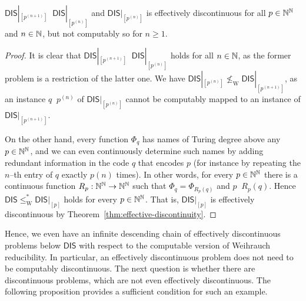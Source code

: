 \documentclass{amsart}
\def\IN{{\Bbb{N}}}
\def\leqT{\mathop{\leq_{\mathrm{T}}}}
\def\equivT{\mathop{\equiv_{\mathrm{T}}}}
\def\leqSW{\mathop{\leq_{\mathrm{sW}}}}
\def\lW{\mathop{<_{\mathrm{W}}}}
\def\leqT{\mathop{\leq_{\mathrm{T}}}}
\def\equivT{\mathop{\equiv_{\mathrm{T}}}}
\def\leqSW{\mathop{\leq_{\mathrm{sW}}}}
\def\lW{\mathop{<_{\mathrm{W}}}}
\def\DIS{\mathsf{DIS}}
\begin{document}
\begin{proposition}
\label{prop:decreasing-DIS-chain}
$\DIS|_{[p^{(n+1)}]}\lW\DIS|_{[p^{(n)}]}$ and $\DIS|_{[p^{(n)}]}$ is effectively discontinuous for all $p\in\IN^\IN$ and $n\in\IN$, but not computably so for $n\geq1$.
\end{proposition}
\begin{proof}
It is clear that $\DIS|_{[p^{(n+1)}]}\leqSW\DIS|_{[p^{(n)}]}$ holds for all $n\in\IN$, as the 
former problem is a restriction of the latter one. We have $\DIS|_{[p^{(n)}]}\not\leq_\mathrm{W}\DIS|_{[p^{(n+1)}]}$,
as an instance $q\equivT p^{(n)}$ of $\DIS|_{[p^{(n)}]}$ cannot be computably mapped to an
instance of $\DIS|_{[p^{(n+1)}]}$.

On the other hand, every function $\Phi_q$ has names of Turing degree above any $p\in\IN^\IN$, and we can even continuously
determine such names by adding redundant information in the code $q$ that encodes $p$ (for instance by repeating the $n$--th entry of $q$ exactly $p(n)$ times). 
In other words, for every $p\in\IN^\IN$ there is a continuous function $R_p:\IN^\IN\to\IN^\IN$ such that $\Phi_q=\Phi_{R_p(q)}$ and $p\leqT R_p(q)$.
Hence $\DIS\leq_\mathrm{W}^*\DIS|_{[p]}$ holds for every $p\in\IN^\IN$. That is, $\DIS|_{[p]}$ is effectively discontinuous by Theorem~\ref{thm:effective-discontinuity}.
\end{proof}

Hence, we even have an infinite descending chain of effectively discontinuous problems below $\DIS$
with respect to the computable version of Weihrauch reducibility.
In particular, an effectively discontinuous problem does not need to be computably discontinuous.
The next question is whether there are discontinuous problems, which are not even effectively discontinuous.
The following proposition provides a sufficient condition for such an example.
\end{document}
